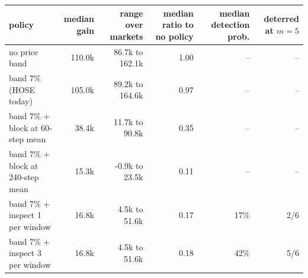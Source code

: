 \begin{tabular}{lrrrrr}
\toprule
policy & median gain & range over markets & median ratio to no policy & median detection prob. & deterred at $m=5$ \\
\midrule
no price band & 110.0k & 86.7k to 162.1k & 1.00 & -- & -- \\
band 7\% (HOSE today) & 105.0k & 89.2k to 164.6k & 0.97 & -- & -- \\
band 7\% + block at 60-step mean & 38.4k & 11.7k to 90.8k & 0.35 & -- & -- \\
band 7\% + block at 240-step mean & 15.3k & -0.9k to 23.5k & 0.11 & -- & -- \\
band 7\% + inspect 1 per window & 16.8k & 4.5k to 51.6k & 0.17 & 17\% & 2/6 \\
band 7\% + inspect 3 per window & 16.8k & 4.5k to 51.6k & 0.18 & 42\% & 5/6 \\
\bottomrule
\end{tabular}
